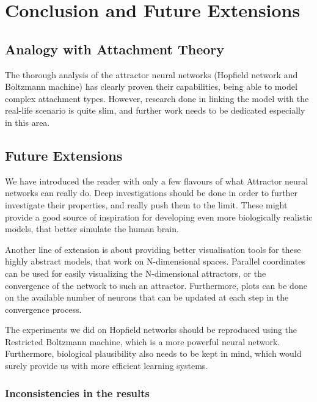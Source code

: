 \chapter{Conclusion and Future Extensions}

\section{Analogy with Attachment Theory}

The thorough analysis of the attractor neural networks (Hopfield network and Boltzmann machine) has clearly proven their capabilities, being able to model complex attachment types. However, research done in linking the model with the real-life scenario is quite slim, and further work needs to be dedicated especially in this area.

\section{Future Extensions}

We have introduced the reader with only a few flavours of what Attractor neural networks can really do. Deep investigations should be done in order to further investigate their properties, and really push them to the limit. These might provide a good source of inspiration for developing even more biologically realistic models, that better simulate the human brain.

Another line of extension is about providing better visualisation tools for these highly abstract models, that work on N-dimensional spaces. Parallel coordinates can be used for easily visualizing the N-dimensional attractors, or the convergence of the network to such an attractor. Furthermore, plots can be done on the available number of neurons that can be updated at each step in the convergence process.

The experiments we did on Hopfield networks should be reproduced using the Restricted Boltzmann machine, which is a more powerful neural network. Furthermore, biological plausibility also needs to be kept in mind, which would surely provide us with more efficient learning systems.

\subsection{Inconsistencies in the results}
\label{inconsistencies}

